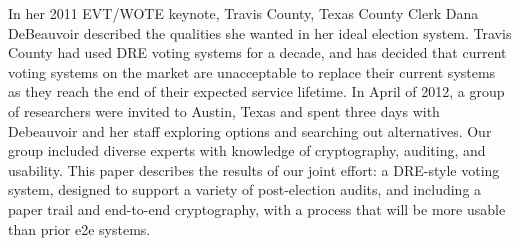 In her 2011 EVT/WOTE keynote, Travis County, Texas County Clerk Dana DeBeauvoir described the qualities she wanted in her ideal election system. Travis County had used DRE voting systems for a decade, and has decided that current voting systems on the market are unacceptable to replace their current systems as they reach the end of their expected service lifetime. In April of 2012, a group of researchers were invited to Austin, Texas and spent three days with   Debeauvoir and her staff exploring options and searching out alternatives. Our group included diverse experts with knowledge of cryptography, auditing, and usability. This paper describes the results of our joint effort: a DRE-style voting system, designed to support a variety of post-election audits, and including a paper trail and end-to-end cryptography, with a process that will be more usable than prior e2e systems.
